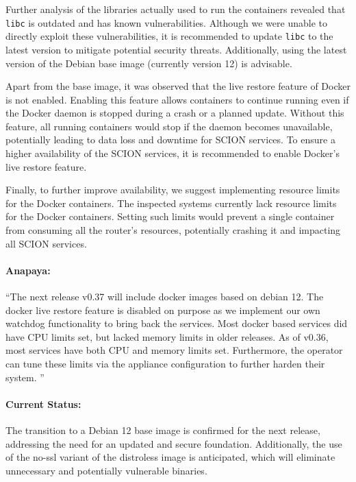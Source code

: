 Further analysis of the libraries actually used to run the containers revealed that \texttt{libc} is outdated and has known vulnerabilities.
Although we were unable to directly exploit these vulnerabilities, it is recommended to update \texttt{libc} to the latest version to mitigate potential security threats.
Additionally, using the latest version of the Debian base image (currently version 12) is advisable.

Apart from the base image, it was observed that the live restore feature of Docker is not enabled.
Enabling this feature allows containers to continue running even if the Docker daemon is stopped during a crash or a planned update.
Without this feature, all running containers would stop if the daemon becomes unavailable, potentially leading to data loss and downtime for SCION services.
To ensure a higher availability of the SCION services, it is recommended to enable Docker's live restore feature.

Finally, to further improve availability, we suggest implementing resource limits for the Docker containers.
The inspected systems currently lack resource limits for the Docker containers.
Setting such limits would prevent a single container from consuming all the router's resources, potentially crashing it and impacting all SCION services.

\begin{boxH}
\paragraph{Anapaya:}
``The next release v0.37 will include docker images based on debian 12. The docker live restore feature is disabled on purpose as we implement our own watchdog functionality to bring back the services. Most docker based services did have CPU limits set, but lacked memory limits in older releases. As of v0.36, most services have both CPU and memory limits set. Furthermore, the operator can tune these limits via the appliance configuration to further harden their system.
''
\end{boxH}

\paragraph{Current Status:}
The transition to a Debian 12 base image is confirmed for the next release, addressing the need for an updated and secure foundation.
Additionally, the use of the no-ssl variant of the distroless image is anticipated, which will eliminate unnecessary and potentially vulnerable binaries.

